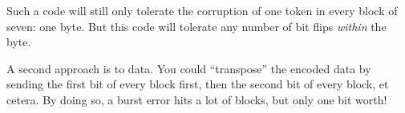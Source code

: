 \documentclass[11pt, oneside]{amsart}
\begin{document}
Such a code will still only tolerate the corruption of one token in
every block of seven: one byte. But this code will tolerate any number
of bit flips \emph{within} the byte.

A second approach is to  data. You could ``transpose''
the encoded data by sending the first bit of every block first, then the
second bit of every block, et cetera. By doing so, a burst error hits a
lot of blocks, but only one bit worth!









%
%
\end{document}
